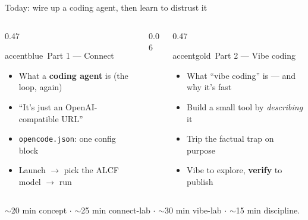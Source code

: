 \begin{frame}{Today: wire up a coding agent, then learn to distrust it}
  \begin{columns}[t, totalwidth=\textwidth]
    \begin{column}{0.47\textwidth}
      \begin{featbox}{accentblue}{\faLaptopCode\ Part 1 --- Connect}
        \small
        \begin{itemize}
          \item What a \textbf{coding agent} is (the loop, again)
          \item ``It's just an OpenAI-compatible URL''
          \item \texttt{opencode.json}: one config block
          \item Launch $\to$ pick the ALCF model $\to$ run
        \end{itemize}
      \end{featbox}
    \end{column}
    \begin{column}{0.06\textwidth}\end{column}
    \begin{column}{0.47\textwidth}
      \begin{featbox}{accentgold}{\faMagic\ Part 2 --- Vibe coding}
        \small
        \begin{itemize}
          \item What ``vibe coding'' is --- and why it's fast
          \item Build a small tool by \emph{describing} it
          \item Trip the factual trap on purpose
          \item Vibe to explore, \textbf{verify} to publish
        \end{itemize}
      \end{featbox}
    \end{column}
  \end{columns}
  \vspace{8pt}
  \begin{center}\small\color{midgray}%
    $\sim$20 min concept $\cdot$ $\sim$25 min connect-lab $\cdot$ $\sim$30 min vibe-lab $\cdot$ $\sim$15 min discipline.\end{center}
\end{frame}

